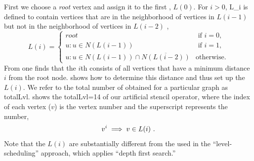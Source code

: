 First we choose a \emph{root} vertex and assign it to the
first \level, $L(0)$\@. For $i>0$, \level \acrshort{L_i}
is defined to contain vertices that are in the neighborhood of vertices
in $L(i-1)$ but not in the neighborhood of vertices
in $L(i-2)$ \cite{BFS_level_def}, \ie
\begin{equation}\label{eq:level}
L(i) = 
\begin{cases}
	 root & \text{ if } i = 0, \\
	 u : u \in N(L(i-1))  & \text{ if } i = 1, \\
	 u : u \in N(L(i-1)) \cap \overline{N(L(i-2))}  & \text{otherwise}.
\end{cases}   
\end{equation}
From  one finds that the $i$th \level consists of all
vertices that have a minimum distance $i$ from the root node.
 shows how to determine this distance and thus set up the
\levels $L(i)$\@. We refer to the total number of \levels obtained for a particular graph
as \acrshort{totalLvl}.  shows the
\acrshort{totalLvl}=14 \levels of our artificial stencil
operator, where the index of each vertex ($v$) is the
vertex number and the superscript represents the \level number, \ie
\begin{equation}\label{eq:node_notation}
	v^i \implies v \in L(i)~.
\end{equation}
Note that the $L(i)$ are  substantially different from the \levels used in
the ``level-scheduling'' \cite{saad} approach, which applies ``depth first
search.''

\setlength{\fboxsep}{0pt}%


